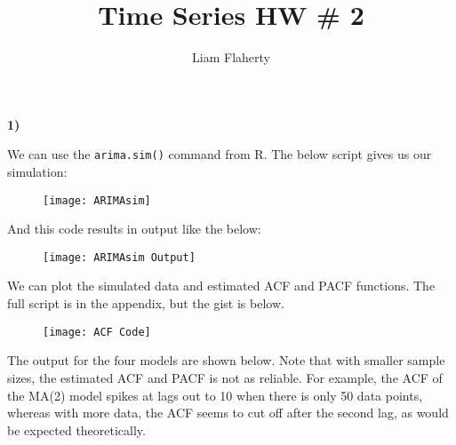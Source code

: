 \documentclass[12pt, letterpaper]{article}
\title{Time Series HW \# 2}
\author{Liam Flaherty}
\date{\parbox{\linewidth}{\centering%
		Professor Martin\endgraf\bigskip
		NCSU: ST546-001\endgraf\bigskip
		September 13, 2024 \endgraf}}
\theoremstyle{definition}
\numberwithin{equation}{section}
\newcommand{\+}[1]{+_{\scalebox{.375}{#1}}}
\newcommand{\1}{\mathbbm{1}}
\begin{document}
\maketitle
\thispagestyle{empty}

\newpage\clearpage\noindent


\noindent\textbf{1) }

\noindent\textbf{}
\vspace{\baselineskip}

We can use the \texttt{arima.sim()} command from R. The below script gives us our simulation:

\begin{figure}[H]
	\centering
	\texttt{[image: ARIMAsim]}	
\end{figure}

And this code results in output like the below:

\begin{figure}[H]
	\centering
	\texttt{[image: ARIMAsim Output]}
\end{figure}




\newpage
\noindent\textbf{}
\vspace{\baselineskip}

We can plot the simulated data and estimated ACF and PACF functions. The full script is in the appendix, but the gist is below.

\begin{figure}[H]
	\centering
	\texttt{[image: ACF Code]}
\end{figure}


The output for the four models are shown below. Note that with smaller sample sizes, the estimated ACF and PACF is not as reliable. For example, the ACF of the MA(2) model spikes at lags out to 10 when there is only 50 data points, whereas with more data, the ACF seems to cut off after the second lag, as would be expected theoretically.
\end{document}

